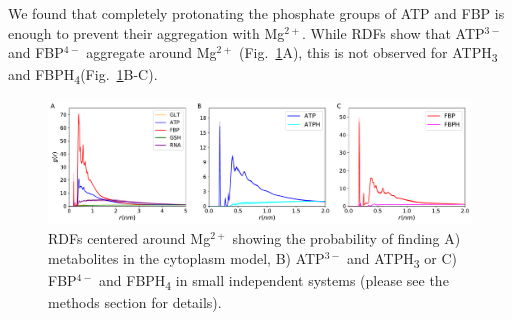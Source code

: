 \documentclass[journal=jpcisd8,manuscript=article]{achemso}
\begin{document}
We found that completely protonating the phosphate groups of ATP and
FBP is enough to prevent their aggregation with Mg$^{2+}$. While RDFs
show that ATP$^{3-}$ and FBP$^{4-}$ aggregate around Mg$^{2+}$
(Fig.~\ref{fig:avoiding_aggregation}A), this is not observed for
ATPH\textsubscript{3} and
FBPH\textsubscript{4}(Fig.~\ref{fig:avoiding_aggregation}B-C).  

\begin{figure}[H]
\hspace*{-2cm}\includegraphics[scale=0.5]{rdf_mg.pdf}
\caption{RDFs centered around Mg$^{2+}$ showing the probability of
  finding A) metabolites in the cytoplasm model, B) ATP$^{3-}$ and
  ATPH\textsubscript{3} or C) FBP$^{4-}$ and FBPH\textsubscript{4} in
  small independent systems (please see the methods section for
  details).}
\label{fig:avoiding_aggregation}
\end{figure}


 
\end{document}
